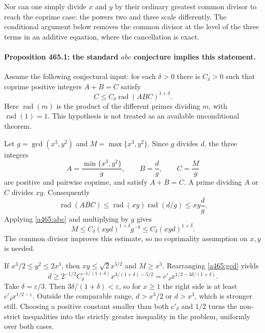 \documentclass[11pt]{article}
\begin{document}
Nor can one simply divide $x$ and $y$ by their ordinary greatest common divisor to reach the coprime case: the powers two and three scale differently. The conditional argument below removes the common divisor at the level of the three terms in an additive equation, where the cancellation is exact.

\paragraph{Proposition 465.1: the standard $abc$ conjecture implies this statement.}
Assume the following conjectural input: for each $\delta>0$ there is $C_\delta>0$ such that coprime positive integers $A+B=C$ satisfy
\begin{equation}\label{a465:abc}
                C\leq C_\delta\operatorname{rad}(ABC)^{1+\delta}.
\end{equation}
Here $\operatorname{rad}(m)$ is the product of the different primes dividing $m$, with $\operatorname{rad}(1)=1$. This hypothesis is not treated as an available unconditional theorem.

Let $g=\gcd(x^3,y^2)$ and $M=\max\{x^3,y^2\}$. Since $g$ divides $d$, the three integers
\[
 A=\frac{\min\{x^3,y^2\}}g,\qquad B=\frac dg,
 \qquad C=\frac Mg
\]
are positive and pairwise coprime, and satisfy $A+B=C$. A prime dividing $A$ or $C$ divides $xy$. Consequently
\[
 \operatorname{rad}(ABC)
 \leq\operatorname{rad}(xy)\operatorname{rad}(d/g)
 \leq xy\frac dg.
\]
Applying \eqref{a465:abc} and multiplying by $g$ gives
\begin{equation}\label{a465:gcd}
 M\leq C_\delta(xyd)^{1+\delta}g^{-\delta}
       \leq C_\delta(xyd)^{1+\delta}.
\end{equation}
The common divisor improves this estimate, so no coprimality assumption on $x,y$ is needed.

If $x^3/2\leq y^2\leq2x^3$, then $xy\leq\sqrt2x^{5/2}$ and $M\geq x^3$. Rearranging \eqref{a465:gcd} yields
\begin{equation}\label{a465:conditional}
 d\geq 2^{-1/2}C_\delta^{-1/(1+\delta)}
       x^{3/(1+\delta)-5/2}
   =c'_{\delta}x^{1/2-3\delta/(1+\delta)}.
\end{equation}
Take $\delta=\varepsilon/3$. Then $3\delta/(1+\delta)<\varepsilon$, so for $x\geq1$ the right side is at least $c'_{\delta}x^{1/2-\varepsilon}$. Outside the comparable range, $d>x^3/2$ or $d>x^3$, which is stronger still. Choosing a positive constant smaller than both $c'_{\delta}$ and $1/2$ turns the non-strict inequalities into the strictly greater inequality in the problem, uniformly over both cases.
\end{document}
